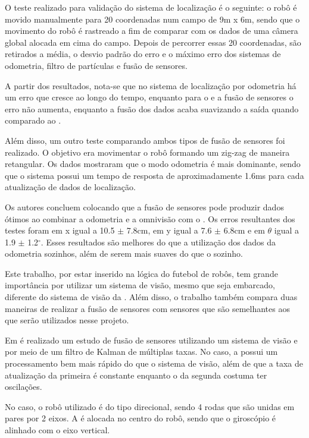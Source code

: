 \documentclass[acronym, symbols, table]{fei}
\begin{document}
O teste realizado para validação do sistema de localização é o seguinte: o robô é movido manualmente para 20 coordenadas num campo de 9m x 6m, sendo que o movimento do robô é rastreado a fim de comparar com os dados de uma câmera global alocada em cima do campo. Depois de percorrer essas 20 coordenadas, são retirados a média, o desvio padrão do erro e o máximo erro dos sistemas de odometria, filtro de partículas e fusão de sensores.

A partir dos resultados, nota-se que no sistema de localização por odometria há um erro que cresce ao longo do tempo, enquanto para o  e a fusão de sensores o erro não aumenta, enquanto a fusão dos dados acaba suavizando a saída quando comparado ao .

Além disso, um outro teste comparando ambos tipos de fusão de sensores foi realizado. O objetivo era movimentar o robô formando um zig-zag de maneira retangular. Os dados mostraram que o modo odometria é mais dominante, sendo que o sistema possui um tempo de resposta de aproximadamente 1.6ms para cada atualização de dados de localização.

Os autores concluem colocando que a fusão de sensores pode produzir dados ótimos ao combinar a odometria e a omnivisão com o . Os erros resultantes dos testes foram em x igual a 10.5 $\pm$ 7.8cm, em y igual a 7.6 $\pm$ 6.8cm e em $\theta$ igual a 1.9 $\pm$ 1.2$^\circ$. Esses resultados são melhores do que a utilização dos dados da odometria sozinhos, além de serem mais suaves do que o  sozinho.

Este trabalho, por estar inserido na lógica do futebol de robôs, tem grande importância por utilizar um sistema de visão, mesmo que seja embarcado, diferente do sistema de visão da . Além disso, o trabalho também compara duas maneiras de realizar a fusão de sensores com sensores que são semelhantes aos que serão utilizados nesse projeto.

Em \textcite{10.1007/978-3-642-54734-8_23} é realizado um estudo de fusão de sensores utilizando um sistema de visão e  por meio de um filtro de Kalman de múltiplas taxas. No caso, a  possui um processamento bem mais rápido do que o sistema de visão, além de que a taxa de atualização da primeira é constante enquanto o da segunda costuma ter oscilações.

No caso, o robô utilizado é do tipo direcional, sendo 4 rodas que são unidas em pares por 2 eixos. A  é alocada no centro do robô, sendo que o giroscópio é alinhado com o eixo vertical.
\end{document}

